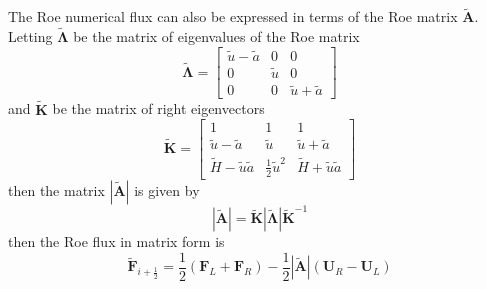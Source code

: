 The Roe numerical flux can also be expressed in terms of the Roe matrix $\boldsymbol{\tilde{A}}$. Letting $\boldsymbol{\tilde{\Lambda}}$ be the matrix of eigenvalues of the Roe matrix
\begin{equation}
	\boldsymbol{\tilde{\Lambda}} = \begin{bmatrix}
		\tilde{u} - \tilde{a} & 0 & 0 \\
		0 & \tilde{u} & 0 \\
		0 & 0 & \tilde{u} + \tilde{a}
	\end{bmatrix}
\end{equation}
and $\boldsymbol{\tilde{K}}$ be the matrix of right eigenvectors
\begin{equation}
	\boldsymbol{\tilde{K}} = \begin{bmatrix}
		1 & 1 & 1 \\
		\tilde{u}-\tilde{a} & \tilde{u} & \tilde{u}+\tilde{a} \\
		\tilde{H}-\tilde{u}\tilde{a} & \frac{1}{2} \tilde{u}^2 & \tilde{H}+\tilde{u}\tilde{a}
	\end{bmatrix}
\end{equation}
then the matrix $|\boldsymbol{\tilde{A}}|$ is given by
\begin{equation}
	|\boldsymbol{\tilde{A}}| = \boldsymbol{\tilde{K}} |\boldsymbol{\tilde{\Lambda}}| \boldsymbol{\tilde{K}}^{-1}
\end{equation}
then the Roe flux in matrix form is
\begin{equation}
	\boldsymbol{\tilde{F}}_{i+\frac{1}{2}} = \frac{1}{2}\left(\boldsymbol{F}_L + \boldsymbol{F}_R\right) - \frac{1}{2} |\boldsymbol{\tilde{A}}| \left(\boldsymbol{U}_R - \boldsymbol{U}_L\right)
\end{equation}

